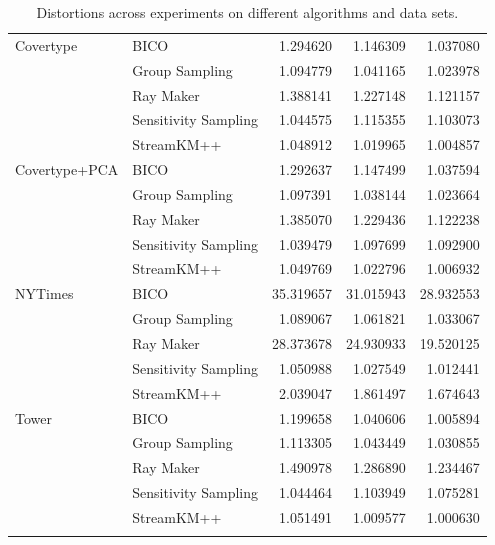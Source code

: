 \begin{longtable}{llrrr}
\midrule
Covertype & BICO &   1.294620 &   1.146309 &   1.037080 \\
      & Group Sampling &   1.094779 &   1.041165 &   1.023978 \\
      & Ray Maker &   1.388141 &   1.227148 &   1.121157 \\
      & Sensitivity Sampling &   1.044575 &   1.115355 &   1.103073 \\
      & StreamKM++ &   1.048912 &   1.019965 &   1.004857 \\
\midrule
Covertype+PCA & BICO &   1.292637 &   1.147499 &   1.037594 \\
      & Group Sampling &   1.097391 &   1.038144 &   1.023664 \\
      & Ray Maker &   1.385070 &   1.229436 &   1.122238 \\
      & Sensitivity Sampling &   1.039479 &   1.097699 &   1.092900 \\
      & StreamKM++ &   1.049769 &   1.022796 &   1.006932 \\
\midrule
NYTimes & BICO &  35.319657 &  31.015943 &  28.932553 \\
      & Group Sampling &   1.089067 &   1.061821 &   1.033067 \\
      & Ray Maker &  28.373678 &  24.930933 &  19.520125 \\
      & Sensitivity Sampling &   1.050988 &   1.027549 &   1.012441 \\
      & StreamKM++ &   2.039047 &   1.861497 &   1.674643 \\
\midrule
Tower & BICO &   1.199658 &   1.040606 &   1.005894 \\
      & Group Sampling &   1.113305 &   1.043449 &   1.030855 \\
      & Ray Maker &   1.490978 &   1.286890 &   1.234467 \\
      & Sensitivity Sampling &   1.044464 &   1.103949 &   1.075281 \\
      & StreamKM++ &   1.051491 &   1.009577 &   1.000630 \\
\bottomrule
\caption{Distortions across experiments on different algorithms and data sets.}
\label{tab:comparison-solution-generation-all}
\end{longtable}





















